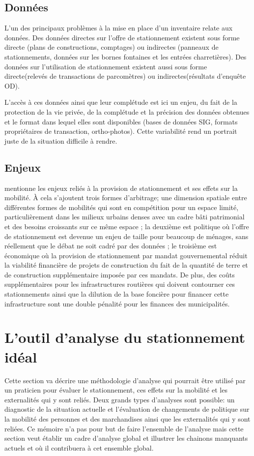 \subsection{Données}

L'un des principaux problèmes à la mise en place d'un inventaire relate aux données. Des données directes sur l'offre de stationnement existent sous forme directe (plans de constructions, comptages) ou indirectes (panneaux de stationnements, données sur les bornes fontaines et les entrées charretières). Des données sur l'utilisation de stationnement existent aussi sous forme directe(relevés de transactions de parcomètres) ou indirectes(résultats d'enquête OD).\par
L'accès à ces données ainsi que leur complétude est ici un enjeu, du fait de la protection de la vie privée, de la complétude et la précision des données obtenues et le format dans lequel elles sont disponibles (bases de données SIG, formats propriétaires de transaction, ortho-photos). Cette variabilité rend un portrait juste de la situation difficile à rendre.

\subsection{Enjeux}

\textcite{Bourdeau:MethodologieAnalyse:2014} mentionne les enjeux reliés à la provision de  stationnement et ses effets sur la mobilité. À cela s'ajoutent trois formes d'arbitrage; une dimension spatiale entre différentes formes de mobilités qui sont en compétition pour un espace limité, particulièrement dans les milieux urbains denses avec un cadre bâti patrimonial et des besoins croissants sur ce même espace ; la deuxième est politique où l'offre de stationnement est devenue un enjeu de taille pour beaucoup de ménages, sans réellement que le débat ne soit cadré par des données ; le troisième est économique où la provision de stationnement par mandat gouvernemental réduit la viabilité financière de projets de construction du fait de la quantité de terre et de construction supplémentaire imposée par ces mandats. De plus, des coûts supplémentaires pour les infrastructures routières qui doivent contourner ces stationnements  \fg{} ainsi que la dilution de la base foncière pour financer cette infrastructure sont une double pénalité pour les finances des municipalités. 


\section{L'outil d'analyse du stationnement idéal}
Cette section va décrire une méthodologie d'analyse qui pourrait être utilisé par un praticien pour évaluer le stationnement, ces effets sur la mobilité et les externalités qui y sont reliés. Deux grands types d'analyses sont possible: un diagnostic de la situation actuelle et l'évaluation de changements de politique sur la mobilité des personnes et des marchandises ainsi que les externalités qui y sont reliées. Ce mémoire n'a pas pour but de faire l'ensemble de l'analyse mais cette section veut établir un cadre d'analyse global et illustrer les chainons manquants actuels et où il contribuera à cet ensemble global.
